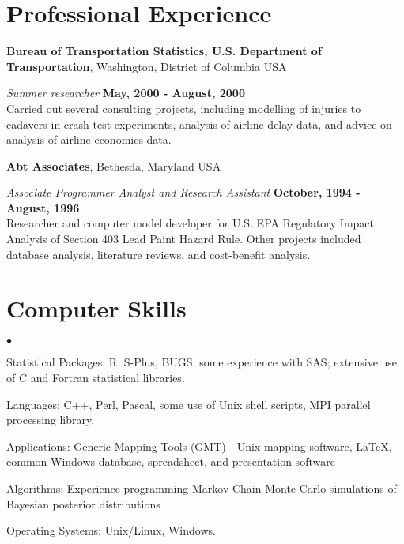 \documentclass[margin,line]{res}
\newenvironment{list2}{
  \begin{list}{$\bullet$}{%
  }}{\end{list}}
\begin{document}
\begin{resume}
\section{\sc Professional Experience}
{\bf Bureau of Transportation Statistics, U.S. Department of
  Transportation}, Washington, District of Columbia USA

\vspace{-.3cm}
{\em Summer researcher} \hfill {\bf May, 2000 - August, 2000}\\
Carried out several consulting projects, including modelling of
injuries to cadavers in crash test experiments, analysis of airline
delay data, and advice on analysis of airline economics data.

{\bf Abt Associates}, Bethesda, Maryland USA

\vspace{-.3cm}
{\em Associate Programmer Analyst and Research Assistant} \hfill {\bf
  October, 1994 - August, 1996}\\
Researcher and computer model developer for U.S. EPA Regulatory Impact
Analysis of Section 403 Lead Paint Hazard Rule.  Other projects
included database analysis, literature reviews, and cost-benefit analysis.

\section{\sc Computer Skills}
\begin{list2}
\item Statistical Packages:  R, S-Plus, BUGS; some experience
  with SAS; extensive use of C and Fortran statistical libraries.
\item Languages:  C++, Perl, Pascal, some use of Unix shell scripts,
  MPI parallel processing library.
\item Applications: Generic Mapping Tools (GMT) - Unix mapping software, \LaTeX, common Windows
  database, spreadsheet, and presentation software
\item Algorithms: Experience programming Markov Chain Monte Carlo
  simulations of Bayesian posterior distributions
\item Operating Systems:  Unix/Linux, Windows.\\
\end{list2}



\end{resume}
\end{document}

